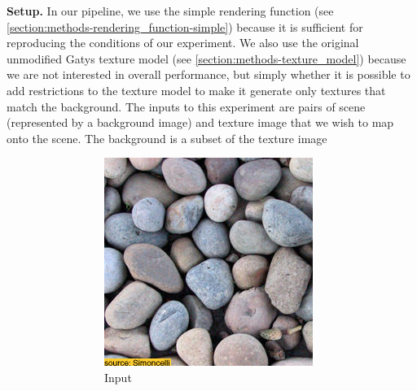\textbf{Setup.} In our pipeline, we use the simple rendering function (see \ref{section:methods-rendering_function-simple}) because it is sufficient for reproducing the conditions of our experiment. We also use the original unmodified Gatys texture model (see \ref{section:methods-texture_model}) because we are not interested in overall performance, but simply whether it is possible to add restrictions to the texture model to make it generate only textures that match the background. The inputs to this experiment are pairs of scene (represented by a background image) and texture image that we wish to map onto the scene. The background is a subset of the texture image

\begin{figure}[]
    \centering    
    \begin{subfigure}{\textwidth}
        \centering
        \begin{subfigure}{0.24\textwidth}
            \centering
            \includegraphics[width=\textwidth]{images/04-experiment01/pebbles/target.jpg}
            \caption{Input}
            \label{fig:ex01-pebbles-1000steps-some_target}
        \end{subfigure}
        \hfill
        \begin{subfigure}{0.24\textwidth}
            \centering

\end{subfigure}
\end{subfigure}
\end{figure}
